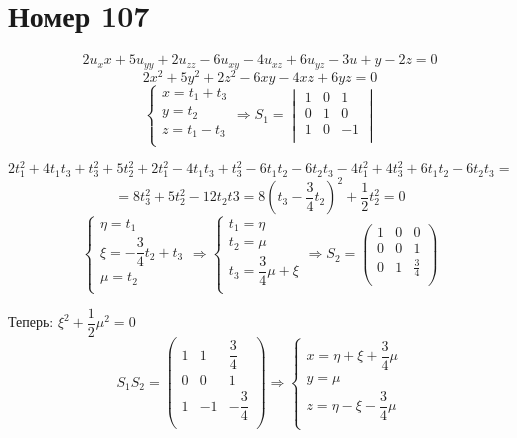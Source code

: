 \section*{Номер 107}
$$ 2u_xx + 5u_{yy} + 2u_{zz} -6u_{xy} -4 u_{xz} +6 u_{yz} - 3u + y - 2z = 0 $$
$$ 2x^2 + 5y^2 + 2z^2 - 6xy - 4xz + 6yz = 0 $$
$$ \begin{cases}
        x = t_1 + t_3 \\
        y = t_2       \\
        z = t_1 - t_3 \\
    \end{cases} \Rightarrow S_1 = \begin{vmatrix}
        1 & 0 & 1  \\
        0 & 1 & 0  \\
        1 & 0 & -1 \\
    \end{vmatrix}$$

$$ 2t_1^2 + 4t_1t_3 + t_3^2 + 5t_2^2 + 2t_1^2 - 4t_1t_3 + t_3^2 - 6t_1t_2 - 6t_2t_3 - 4t_1^2 + 4t_3^2 + 6t_1t_2 - 6t_2t_3 = $$
$$ = 8t_3^2 + 5t_2^2 - 12t_2t3 = 8\left(t_3 - \dfrac{3}{4}t_2\right)^2 + \dfrac{1}{2}t_2^2 = 0 $$
$$ \begin{cases}
        \eta = t_1                   \\
        \xi = -\dfrac{3}{4}t_2 + t_3 \\
        \mu = t_2                    \\
    \end{cases} \Rightarrow \begin{cases}
        t_1 = \eta                   \\
        t_2 = \mu                    \\
        t_3 = \dfrac{3}{4} \mu + \xi \\
    \end{cases} \Rightarrow S_2 = \begin{pmatrix}
        1 & 0 & 0           \\
        0 & 0 & 1           \\
        0 & 1 & \frac{3}{4} \\
    \end{pmatrix} $$

Теперь: $ \xi^2 + \dfrac{1}{2} \mu^2 = 0 $
$$ S_1 S_2 = \begin{pmatrix}
        1 & 1  & \dfrac{3}{4}  \\
        0 & 0  & 1             \\
        1 & -1 & -\dfrac{3}{4} \\
    \end{pmatrix} \Rightarrow \begin{cases}
        x = \eta + \xi + \dfrac{3}{4} \mu \\
        y = \mu                           \\
        z = \eta - \xi - \dfrac{3}{4} \mu \\
    \end{cases}$$

